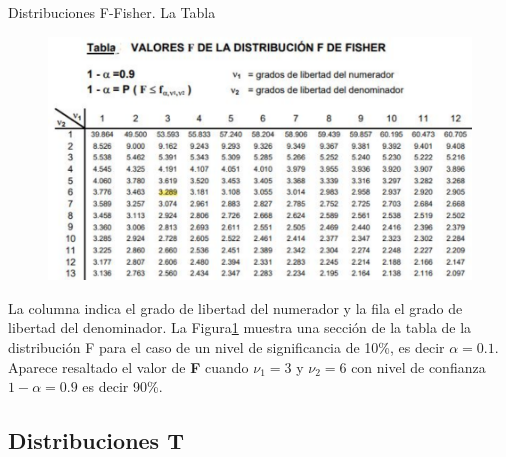 \documentclass[11pt]{beamer}
\begin{document}
      \begin{frame}{Distribuciones F-Fisher. La Tabla}
          \begin{figure}
              \centering
              \includegraphics[width=0.7\linewidth]{images/estadistica14}
              \label{fig:estadistica14}
          \end{figure}
          La columna indica el grado de libertad del numerador y la fila el grado de libertad del denominador.
          La Figura\ref{fig:estadistica14} muestra una sección de la tabla de la distribución F para el caso de un nivel de significancia de 10\%, es decir $\alpha = 0.1$. Aparece resaltado el valor de \textbf{F} cuando $\nu_1= 3$ y $\nu_2 = 6$ con nivel de confianza $1-\alpha  = 0.9$ es decir 90\%.



      \end{frame}

    \subsection*{Distribuciones T}
\end{document}
